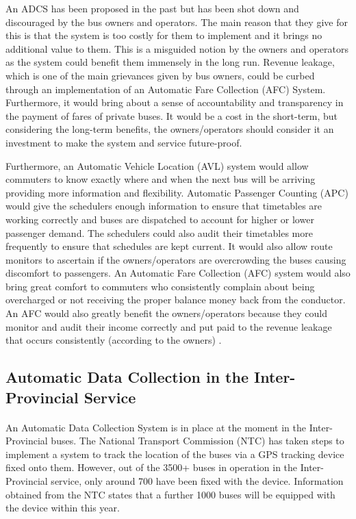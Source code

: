 An ADCS has been proposed in the past but has been shot down and discouraged by the bus owners and operators. The main reason that they give for this is that the system is too costly for them to implement and it brings no additional value to them. This is a misguided notion by the owners and operators as the system could benefit them immensely in the long run. Revenue leakage, which is one of the main grievances given by bus owners, could be curbed through an implementation of an Automatic Fare Collection (AFC) System. Furthermore, it would bring about a sense of accountability and transparency in the payment of fares of private buses. It would be a cost in the short-term, but considering the long-term benefits, the owners/operators should consider it an investment to make the system and service future-proof.

Furthermore, an Automatic Vehicle Location (AVL) system would allow commuters to know exactly where and when the next bus will be arriving providing more information and flexibility. Automatic Passenger Counting (APC) would give the schedulers enough information to ensure that timetables are working correctly and buses are dispatched to account for higher or lower passenger demand. The schedulers could also audit their timetables more frequently to ensure that schedules are kept current. It would also allow route monitors to ascertain if the owners/operators are overcrowding the buses causing discomfort to passengers. An Automatic Fare Collection (AFC) system would also bring great comfort to commuters who consistently complain about being overcharged or not receiving the proper balance money back from the conductor. An AFC would also greatly benefit the owners/operators because they could monitor and audit their income correctly and put paid to the revenue leakage that occurs consistently (according to the owners) \cite{Wilson2008, Wilson2009, Wilson2012, Fijalkowski2010}.

\subsection{Automatic Data Collection in the Inter-Provincial Service} 

\paragraph{ } An Automatic Data Collection System is in place at the moment in the Inter-Provincial buses. The National Transport Commission (NTC) has taken steps to implement a system to track the location of the buses via a GPS tracking device fixed onto them. However, out of the 3500+ buses in operation in the Inter-Provincial service, only around 700 have been fixed with the device. Information obtained from the NTC states that a further 1000 buses will be equipped with the device within this year.

